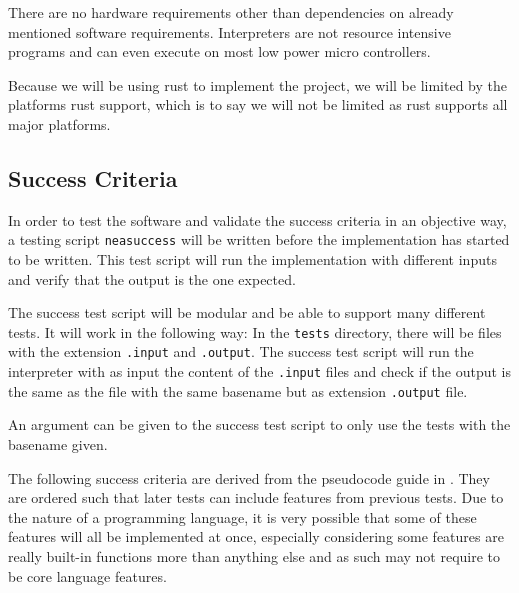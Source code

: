 \documentclass{article}
\begin{document}
There are no hardware requirements other than dependencies on already mentioned
software requirements. Interpreters are not resource intensive programs and can
even execute on most low power micro controllers\cite{micropython}.

Because we will be using rust to implement the project, we will be limited by
the platforms rust support, which is to say we will not be limited as rust
supports all major platforms\cite{rustPlatformSupport}.

\subsection{Success Criteria}

In order to test the software and validate the success criteria in an objective
way, a testing script \texttt{neasuccess} will be written before the
implementation has started to be written. This test script will run the
implementation with different inputs and verify that the output is the one
expected.

The success test script will be modular and be able to support many different
tests. It will work in the following way: In the \texttt{tests} directory,
there will be files with the extension \texttt{.input} and \texttt{.output}.
The success test script will run the interpreter with as input the content of
the \texttt{.input} files and check if the output is the same as the file with
the same basename but as extension \texttt{.output} file.

An argument can be given to the success test script to only use the tests with
the basename given.

The following success criteria are derived from the pseudocode guide in
\textcite{h446}. They are ordered such that later tests can include features
from previous tests. Due to the nature of a programming language, it is very
possible that some of these features will all be implemented at once,
especially considering some features are really built-in functions more than
anything else and as such may not require to be core language features.
\end{document}
